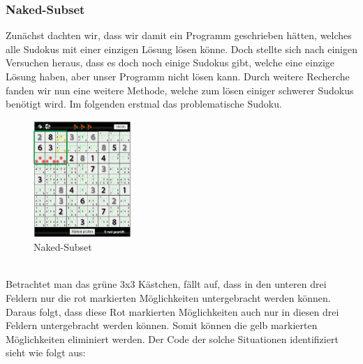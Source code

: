 \documentclass[11pt,a4paper]{article}
\begin{document}
\subsubsection{Naked-Subset}
Zunächst dachten wir, dass wir damit ein Programm geschrieben hätten, welches alle Sudokus mit einer einzigen Lösung lösen könne. Doch stellte sich nach einigen Versuchen heraus, dass es doch noch einige Sudokus gibt, welche eine einzige Lösung haben, aber unser Programm nicht lösen kann. Durch weitere Recherche fanden wir nun eine weitere Methode, welche zum lösen einiger schwerer Sudokus benötigt wird. Im folgenden erstmal das problematische Sudoku.
\newpage
\ \\
\begin{figure}[htbp!]
\begin{center}
\includegraphics[width=0.33\textwidth]{sudoku6.pdf}
\end{center}
\caption{Naked-Subset}
\end{figure}
\ \\ 
Betrachtet man das grüne 3x3 Kästchen, fällt auf, dass in den unteren drei Feldern nur die rot markierten Möglichkeiten untergebracht werden können. Daraus folgt, dass diese Rot markierten Möglichkeiten auch nur in diesen drei Feldern untergebracht werden können. Somit können die gelb markierten Möglichkeiten eliminiert werden. Der Code der solche Situationen identifiziert sieht wie folgt aus:
\end{document}
